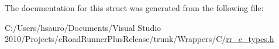 \-The documentation for this struct was generated from the following file\-:\begin{DoxyCompactItemize}
\item 
\-C\-:/\-Users/hsauro/\-Documents/\-Visual Studio 2010/\-Projects/c\-Road\-Runner\-Plus\-Release/trunk/\-Wrappers/\-C/\hyperlink{rr__c__types_8h}{rr\-\_\-c\-\_\-types.\-h}\end{DoxyCompactItemize}
